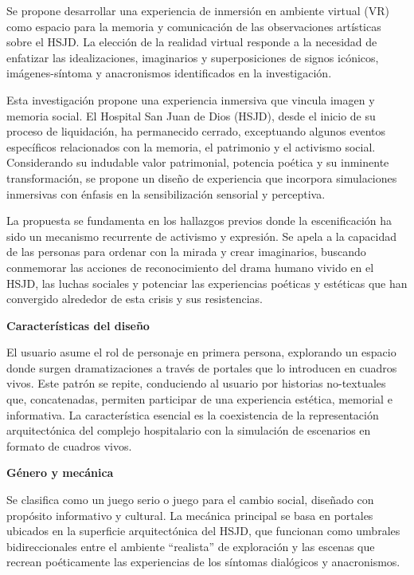 Se propone desarrollar una experiencia de inmersión en ambiente virtual (VR) como espacio para la memoria y comunicación de las observaciones artísticas sobre el HSJD. La elección de la realidad virtual responde a la necesidad de enfatizar las idealizaciones, imaginarios y superposiciones de signos icónicos, imágenes-síntoma y anacronismos identificados en la investigación.


Esta investigación propone una experiencia inmersiva que vincula imagen y memoria social. El Hospital San Juan de Dios (HSJD), desde el inicio de su proceso de liquidación, ha permanecido cerrado, exceptuando algunos eventos específicos relacionados con la memoria, el patrimonio y el activismo social. Considerando su indudable valor patrimonial, potencia poética y su inminente transformación, se propone un diseño de experiencia que incorpora simulaciones inmersivas con énfasis en la sensibilización sensorial y perceptiva.

La propuesta se fundamenta en los hallazgos previos donde la escenificación ha sido un mecanismo recurrente de activismo y expresión. Se apela a la capacidad de las personas para ordenar con la mirada y crear imaginarios, buscando conmemorar las acciones de reconocimiento del drama humano vivido en el HSJD, las luchas sociales y potenciar las experiencias poéticas y estéticas que han convergido alrededor de esta crisis y sus resistencias.

\textbf{Características del diseño}

El usuario asume el rol de personaje en primera persona, explorando un espacio donde surgen dramatizaciones a través de portales que lo introducen en cuadros vivos. Este patrón se repite, conduciendo al usuario por historias no-textuales que, concatenadas, permiten participar de una experiencia estética, memorial e informativa. La característica esencial es la coexistencia de la representación arquitectónica del complejo hospitalario con la simulación de escenarios en formato de cuadros vivos.

\textbf{Género y mecánica}

Se clasifica como un juego serio o juego para el cambio social, diseñado con propósito informativo y cultural. La mecánica principal se basa en portales ubicados en la superficie arquitectónica del HSJD, que funcionan como umbrales bidireccionales entre el ambiente ``realista'' de exploración y las escenas que recrean poéticamente las experiencias de los síntomas dialógicos y anacronismos.

